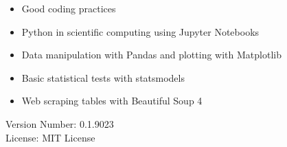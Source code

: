 \documentclass{book}
\newcommand{\booklicense}{MIT License}
\newcommand{\bookversion}{0.1.9023}
\begin{document}
\begin{titlepage}
\begin{flushleft}
\begin{tcolorbox}[skin = widget, boxrule = 1mm, coltitle = white, colframe = white, colback = white, width=(\textwidth), before=\hfill, after=\hfill]
\begin{itemize}
    \item Good coding practices
    \item Python in scientific computing using Jupyter Notebooks
    \item Data manipulation with Pandas and plotting with Matplotlib
    \item Basic statistical tests with statsmodels
    \item Web scraping tables with Beautiful Soup 4
\end{itemize}
\vspace{5mm}
Version Number: \bookversion\\
License: \booklicense
\end{tcolorbox}
\end{flushleft}
\end{titlepage}
\restoregeometry
\end{document}
